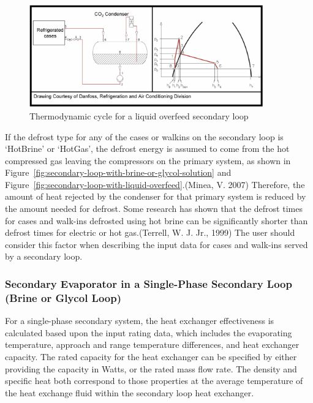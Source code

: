 \begin{figure}[hbtp] %
\centering
\includegraphics[width=0.9\textwidth, height=0.9\textheight, keepaspectratio=true]{media/image6325.png}
\caption{Thermodynamic cycle for a liquid overfeed secondary loop \protect \label{fig:thermodynamic-cycle-for-a-liquid-overfeed}}
\end{figure}

If the defrost type for any of the cases or walkins on the secondary loop is `HotBrine' or `HotGas', the defrost energy is assumed to come from the hot compressed gas leaving the compressors on the primary system, as shown in Figure~\ref{fig:secondary-loop-with-brine-or-glycol-solution} and Figure~\ref{fig:secondary-loop-with-liquid-overfeed}.(Minea, V. 2007) Therefore, the amount of heat rejected by the condenser for that primary system is reduced by the amount needed for defrost. Some research has shown that the defrost times for cases and walk-ins defrosted using hot brine can be significantly shorter than defrost times for electric or hot gas.(Terrell, W. J. Jr., 1999) The user should consider this factor when describing the input data for cases and walk-ins served by a secondary loop.

\subsubsection{Secondary Evaporator in a Single-Phase Secondary Loop (Brine or Glycol Loop)}\label{secondary-evaporator-in-a-single-phase-secondary-loop-brine-or-glycol-loop}

For a single-phase secondary system, the heat exchanger effectiveness is calculated based upon the input rating data, which includes the evaporating temperature, approach and range temperature differences, and heat exchanger capacity. The rated capacity for the heat exchanger can be specified by either providing the capacity in Watts, or the rated mass flow rate. The density and specific heat both correspond to those properties at the average temperature of the heat exchange fluid within the secondary loop heat exchanger.

